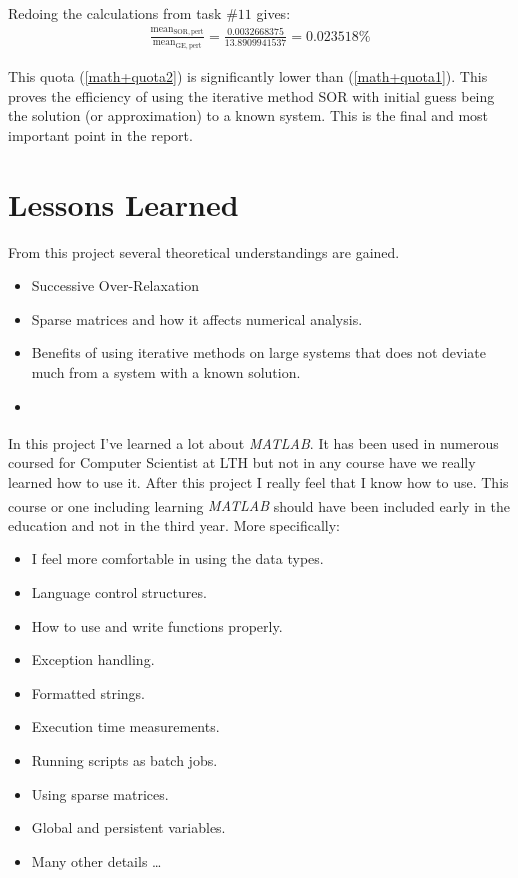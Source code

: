 \documentclass[10pt, a4paper]{article}
\newcommand{\matlab}{\small{\emph{MATLAB\textsuperscript{\textregistered}}}}
\begin{document}
Redoing the calculations from task $\#11$ gives:
\begin{eqnarray}
	\frac{\mathrm{mean}_{\mathrm{SOR, pert}}}{\mathrm{mean}_{\mathrm{GE, pert}}}=\frac{0.0032668375}{13.8909941537} =  0.023518\% \label{math+quota2}
\end{eqnarray}

This quota (\ref{math+quota2}) is significantly lower than (\ref{math+quota1}). This proves the efficiency of using the iterative method SOR with initial guess being the solution (or approximation) to a known system. This is the final and most important point in the report.

\section{Lessons Learned}
From this project several theoretical understandings are gained.
\begin{itemize}
	\item Successive Over-Relaxation
	\item Sparse matrices  and how it affects numerical analysis.
	\item Benefits of using iterative methods on large systems that does not deviate much from a system with a known solution.
	\item
\end{itemize}

In this project I've learned a lot about \matlab{}. It has been used in numerous coursed for Computer Scientist at LTH but not in any course have we really learned how to use it. After this project I really feel that I know how to use. This course or one including learning \matlab{} should have been included early in the education and not in the third year. More specifically:

\begin{itemize}
	\item I feel more comfortable in using the data types.
	\item Language control structures.
	\item How to use and write functions properly.
	\item Exception handling.
	\item Formatted strings.
	\item Execution time measurements.
	\item Running scripts as batch jobs.
	\item Using sparse matrices.
	\item Global and persistent variables.
	\item Many other details \ldots
\end{itemize}
\end{document}
